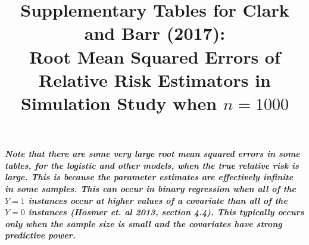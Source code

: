 \documentclass[12pt,a4paper]{article}
\date{}
\begin{document}
\title{Supplementary Tables for Clark and Barr (2017):  \\  
Root Mean Squared Errors of Relative Risk Estimators in Simulation Study when $n=1000$ }


\maketitle



{\bf \it Note that there are some very large root mean squared errors in some tables, for the logistic and other models, when the true relative risk is large. This is because the parameter estimates are effectively infinite in some samples. This can occur in binary regression when all of the $Y=1$ instances occur at higher values of a covariate than all of the $Y=0$ instances (Hosmer et. al 2013, section 4.4). This typically occurs only when the sample size is small and the covariates have strong predictive power.}
\end{document}
